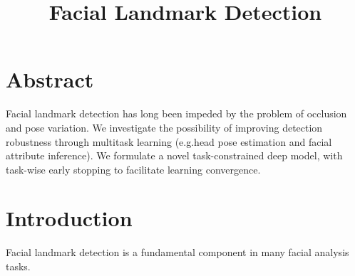 \documentclass{ctexart}
\begin{document}
\setlength{\parindent}{0pt}

\title{Facial Landmark Detection}
\maketitle

\section{Abstract}
Facial landmark detection has long been impeded by the problem of occlusion and pose
variation. We investigate the possibility of improving detection robustness through
multitask learning (e.g.head pose estimation and facial attribute inference). We
formulate a novel task-constrained deep model, with task-wise early stopping to facilitate
learning convergence.

\section{Introduction}
Facial landmark detection is a fundamental component in many facial analysis tasks.
\end{document}
